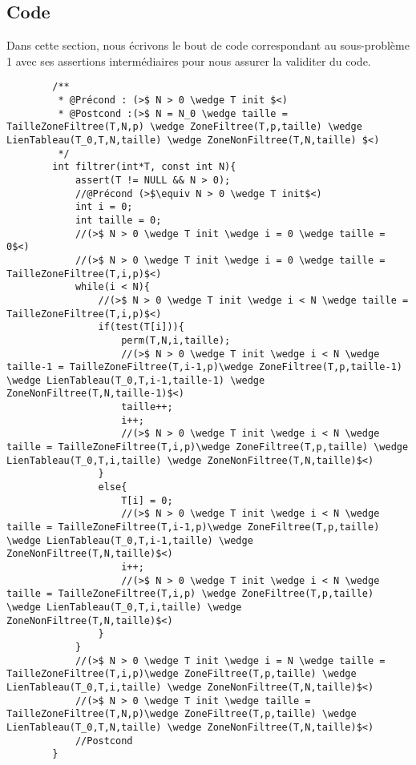 \documentclass[a4paper, 11pt, oneside]{article}
\begin{document}
    \subsection{Code}
        Dans cette section, nous écrivons le bout de code correspondant au sous-problème 1 avec ses assertions
        intermédiaires pour nous assurer la validiter du code.
        \begin{lstlisting}
        /**
         * @Précond : (>$ N > 0 \wedge T init $<)
         * @Postcond :(>$ N = N_0 \wedge taille = TailleZoneFiltree(T,N,p) \wedge ZoneFiltree(T,p,taille) \wedge LienTableau(T_0,T,N,taille) \wedge ZoneNonFiltree(T,N,taille) $<)
         */
        int filtrer(int*T, const int N){
            assert(T != NULL && N > 0);
            //@Précond (>$\equiv N > 0 \wedge T init$<)
            int i = 0;
            int taille = 0;
            //(>$ N > 0 \wedge T init \wedge i = 0 \wedge taille = 0$<)
            //(>$ N > 0 \wedge T init \wedge i = 0 \wedge taille = TailleZoneFiltree(T,i,p)$<)
            while(i < N){
                //(>$ N > 0 \wedge T init \wedge i < N \wedge taille = TailleZoneFiltree(T,i,p)$<)
                if(test(T[i])){
                    perm(T,N,i,taille);
                    //(>$ N > 0 \wedge T init \wedge i < N \wedge taille-1 = TailleZoneFiltree(T,i-1,p)\wedge ZoneFiltree(T,p,taille-1) \wedge LienTableau(T_0,T,i-1,taille-1) \wedge ZoneNonFiltree(T,N,taille-1)$<)
                    taille++;
                    i++;
                    //(>$ N > 0 \wedge T init \wedge i < N \wedge taille = TailleZoneFiltree(T,i,p)\wedge ZoneFiltree(T,p,taille) \wedge LienTableau(T_0,T,i,taille) \wedge ZoneNonFiltree(T,N,taille)$<)
                }
                else{
                    T[i] = 0;
                    //(>$ N > 0 \wedge T init \wedge i < N \wedge taille = TailleZoneFiltree(T,i-1,p)\wedge ZoneFiltree(T,p,taille) \wedge LienTableau(T_0,T,i-1,taille) \wedge ZoneNonFiltree(T,N,taille)$<)
                    i++;
                    //(>$ N > 0 \wedge T init \wedge i < N \wedge taille = TailleZoneFiltree(T,i,p) \wedge ZoneFiltree(T,p,taille) \wedge LienTableau(T_0,T,i,taille) \wedge ZoneNonFiltree(T,N,taille)$<)
                }
            }
            //(>$ N > 0 \wedge T init \wedge i = N \wedge taille = TailleZoneFiltree(T,i,p)\wedge ZoneFiltree(T,p,taille) \wedge LienTableau(T_0,T,i,taille) \wedge ZoneNonFiltree(T,N,taille)$<)
            //(>$ N > 0 \wedge T init \wedge taille = TailleZoneFiltree(T,N,p)\wedge ZoneFiltree(T,p,taille) \wedge LienTableau(T_0,T,N,taille) \wedge ZoneNonFiltree(T,N,taille)$<)
            //Postcond
        }    
        \end{lstlisting}
\end{document}
